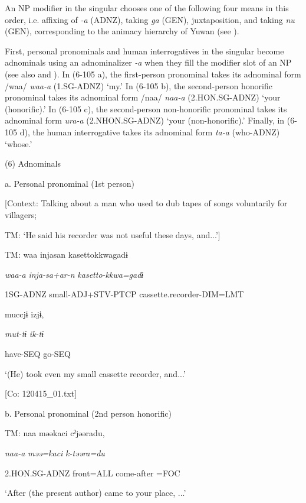 An NP modifier in the singular chooses one of the following four means in this order, i.e. affixing of \textit{{}-a} (ADNZ), taking \textit{ga} (GEN), juxtaposition, and taking \textit{nu} (GEN), corresponding to the animacy hierarchy of Yuwan (see ).

First, personal pronominals and human interrogatives in the singular become adnominals using an adnominalizer \textit{{}-a} when they fill the modifier slot of an NP (see also  and ). In (6-105 a), the first-person pronominal takes its adnominal form /waa/ \textit{waa-a} (1.SG-ADNZ) ‘my.’ In (6-105 b), the second-person honorific pronominal takes its adnominal form /naa/ \textit{naa-a} (2.HON.SG-ADNZ) ‘your (honorific).’ In (6-105 c), the second-person non-honorific pronominal takes its adnominal form \textit{ura-a} (2.NHON.SG-ADNZ) ‘your (non-honorific).’ Finally, in (6-105 d), the human interrogative takes its adnominal form \textit{ta-a} (who-ADNZ) ‘whose.’

(6)  Adnominals

  a.  Personal pronominal (1st person)

    [Context: Talking about a man who used to dub tapes of songs voluntarily for villagers;

TM: ‘He said his recorder was not useful these days, and...’]

    TM:  waa  injasan  {\textbar}kasetto{\textbar}kkwagadɨ

      \textit{waa-a}  \textit{inja-sa+ar-n}\textsubscript{} \textit{kasetto-kkwa=gadɨ}

      1SG-ADNZ  small-ADJ+STV-PTCP  cassette.recorder-DIM=LMT

      muccjɨ  izjɨ,

      \textit{mut-tɨ}  \textit{ik-tɨ}

      have-SEQ  go-SEQ

      ‘(He) took even my small cassette recorder, and...’

      [Co: 120415\_01.txt]

  b.  Personal pronominal (2nd person honorific)

    TM:  naa  məəkaci  cˀjəəradu,

      \textit{naa-a}  \textit{məə=kaci}  \textit{k-təəra=du}

      2.HON.SG-ADNZ  front=ALL  come-after =FOC

      ‘After (the present author) came to your place, ...’

